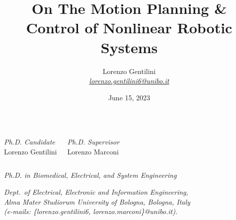 \documentclass[10pt,aspectratio=169]{beamer}
\title[Motion Planning \& Control]
		{On The Motion Planning \& Control of Nonlinear Robotic Systems}
\author[L. Gentilini]
			{Lorenzo Gentilini \\
				{\textit{\href{mailto:lorenzo.gentilini6@unibo.it}{lorenzo.gentilini6@unibo.it}}}
			}
\date{June 15, 2023}
\begin{document}
\footnotesize

\begin{frame}
	\centering

	\vspace{1.5cm}
	\textcolor{blue@O4S}{\Large \inserttitle}

	\vspace{1cm}
	\begin{columns}[t]

		\centering
		\textit{Ph.D. Candidate} \\ \vspace{0,1cm} {\normalsize Lorenzo Gentilini}

		\centering
		\textit{Ph.D. Supervisor} \\ \vspace{0,1cm} {\normalsize Lorenzo Marconi}

	\end{columns}

	\vspace{1.5cm}
	\textit{Ph.D. in Biomedical, Electrical, and System Engineering}

	\vspace{0.3cm}
	\textcolor{emph@O4S}{
		\textit{
			Dept.~of Electrical, Electronic and Information Engineering, \\
			Alma Mater Studiorum University of Bologna, Bologna, Italy \\
			(e-mails: \{lorenzo.gentilini6, lorenzo.marconi\}@unibo.it).
		}
	}
\end{frame}
\end{document}

